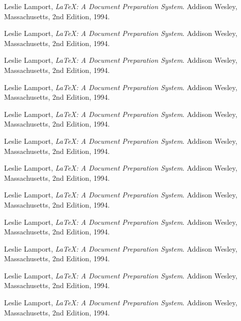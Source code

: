 \documentclass[12pt, aps,pra,amsmath,amssymb,showpacs,twocolumn,preprintnumbers,
floatfix,letterpaper]{revtex4-1}
\begin{document}
\begin{thebibliography}{99}

 Leslie Lamport,
 \emph{\LaTeX: A Document Preparation System}.
 Addison Wesley, Massachusetts,
 2nd Edition,
 1994.

 Leslie Lamport,
 \emph{\LaTeX: A Document Preparation System}.
 Addison Wesley, Massachusetts,
 2nd Edition,
 1994.

 Leslie Lamport,
 \emph{\LaTeX: A Document Preparation System}.
 Addison Wesley, Massachusetts,
 2nd Edition,
 1994.

 Leslie Lamport,
 \emph{\LaTeX: A Document Preparation System}.
 Addison Wesley, Massachusetts,
 2nd Edition,
 1994.

 Leslie Lamport,
 \emph{\LaTeX: A Document Preparation System}.
 Addison Wesley, Massachusetts,
 2nd Edition,
 1994.

 Leslie Lamport,
 \emph{\LaTeX: A Document Preparation System}.
 Addison Wesley, Massachusetts,
 2nd Edition,
 1994.

 Leslie Lamport,
 \emph{\LaTeX: A Document Preparation System}.
 Addison Wesley, Massachusetts,
 2nd Edition,
 1994.

 Leslie Lamport,
 \emph{\LaTeX: A Document Preparation System}.
 Addison Wesley, Massachusetts,
 2nd Edition,
 1994.

 Leslie Lamport,
 \emph{\LaTeX: A Document Preparation System}.
 Addison Wesley, Massachusetts,
 2nd Edition,
 1994.

 Leslie Lamport,
 \emph{\LaTeX: A Document Preparation System}.
 Addison Wesley, Massachusetts,
 2nd Edition,
 1994.

 Leslie Lamport,
 \emph{\LaTeX: A Document Preparation System}.
 Addison Wesley, Massachusetts,
 2nd Edition,
 1994.

 Leslie Lamport,
 \emph{\LaTeX: A Document Preparation System}.
 Addison Wesley, Massachusetts,
 2nd Edition,
 1994.




\end{thebibliography}
\end{document}
